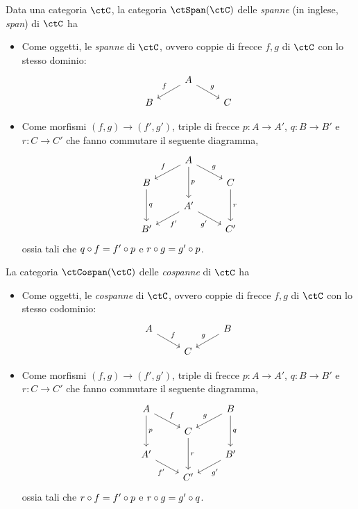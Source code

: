\begin{definition}\label{def_span_e_cospan}
  Data una categoria \(\ctC\), la categoria \(\ctSpan(\ctC)\) delle \emph{spanne} (in inglese, \emph{span}) di \(\ctC\) ha
	\begin{itemize}
    \item Come oggetti, le \emph{spanne} di \(\ctC\), ovvero coppie di frecce \(f,g\) di \(\ctC\) con lo stesso dominio:
      \[
			      \begin{tikzcd}[row sep=small]
				      & A \ar{dl}[swap]{f} \ar{dr}{g} \\
				      B && C
			      \end{tikzcd}
		      \]
		\item Come morfismi \((f,g)\to (f',g')\), triple di frecce \(p:A\to A'\), \(q:B\to B'\) e \(r:C\to C'\) che fanno commutare il seguente diagramma,
		      \[
			      \begin{tikzcd}[row sep=small]
				      & A \ar{dd}{p} \ar{dl}[swap]{f} \ar{dr}{g} \\
				      B \ar{dd}{q} && C \ar{dd}{r} \\
				      & A' \ar{dl}{f'} \ar{dr}[swap]{g'} \\
				      B' && C'
			      \end{tikzcd}
		      \]
		      ossia tali che \(q\circ f=f'\circ p\) e \(r\circ g=g'\circ p\).
	\end{itemize}

	La categoria \(\ctCospan(\ctC)\) delle \emph{cospanne} di \(\ctC\) ha
	\begin{itemize}
		\item Come oggetti, le \emph{cospanne} di \(\ctC\), ovvero coppie di frecce \(f,g\) di \(\ctC\) con lo stesso codominio:
		      \[
			      \begin{tikzcd}[row sep=small]
				      A \ar{dr}{f} && B \ar{dl}[swap]{g} \\
				      & C
			      \end{tikzcd}
		      \]
		\item Come morfismi \((f,g)\to (f',g')\), triple di frecce \(p:A\to A'\), \(q:B\to B'\) e \(r:C\to C'\) che fanno commutare il seguente diagramma,
		      \[
			      \begin{tikzcd}[row sep=small]
				      A \ar{dd}{p} \ar{dr}{f} && B \ar{dd}{q} \ar{dl}[swap]{g} \\
				      & C \ar{dd}{r} \\
				      A' \ar{dr}[swap]{f'} && B' \ar{dl}{g'} \\
				      & C'
			      \end{tikzcd}
		      \]
		      ossia tali che \(r\circ f=f'\circ p\) e \(r\circ g=g'\circ q\).
	\end{itemize}
\end{definition}
